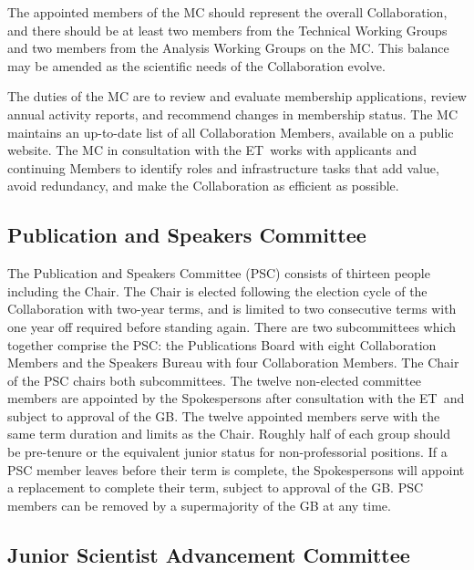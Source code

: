 \documentclass[12pt]{article}
\newcommand{\Comment}[1]{\textcolor{Blue}{(Comment: #1)}}
\newcommand{\exec}{{Executive Team}}
\newcommand{\shorte}{{ET}}  %
\begin{document}
The appointed members of the MC should represent the overall Collaboration, and there should be at least two members from the Technical Working Groups and two members from the Analysis Working Groups on the MC.  This balance may be amended as the scientific needs of the Collaboration evolve. %

The duties of the MC  are to review and evaluate membership applications, review annual activity reports, and recommend changes in membership status. The MC maintains an up-to-date list of all Collaboration Members, available on a public website.  The MC in consultation with the \shorte\ works with applicants and continuing Members to identify roles and infrastructure tasks that add value, avoid redundancy, and make the Collaboration as efficient as possible.  


\subsection{Publication and Speakers  Committee}
\label{sec:pubcouncil}
The Publication and Speakers Committee (PSC) consists of thirteen people including the Chair. The Chair is elected following the election cycle of the Collaboration with  two-year terms, and is limited to two consecutive terms with one year off required before standing again. There are two subcommittees which together comprise the PSC: the Publications Board with eight Collaboration Members and the Speakers Bureau with four Collaboration Members. \textcolor{\markcolor}{The Chair of the PSC chairs both subcommittees.} \textcolor{\markcolor}{The twelve non-elected committee members are appointed by the Spokespersons after consultation with the \shorte\ and subject to approval of the GB.}  %
The twelve appointed members serve with the same {\color{\markcolor} term duration and limits as the Chair.}  Roughly half of each group should be pre-tenure {\color{\markcolor} or the equivalent junior status for non-professorial positions}. If a PSC member leaves before their term is complete, \textcolor{\markcolor}{the Spokespersons %
will appoint a replacement to complete their term, subject to approval of the GB.}  PSC members can be removed by a supermajority of the GB at any time.  
 




\subsection{Junior Scientist Advancement Committee}
\end{document}
